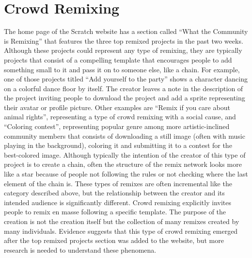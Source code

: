 \section{Crowd Remixing}
The home page of the Scratch website has a section called ``What the Community is Remixing''  that features the three top remixed projects in the past two weeks.
Although these projects could represent any type of remixing, they are typically projects that consist of a compelling template that encourages people to add something small to it and pass it on to someone else, like a chain.
For example, one of those projects titled ``Add yourself to the party'' shows a character dancing on a colorful dance floor by itself.
The creator leaves a note in the description of the project inviting people to download the project and add a sprite representing their avatar or profile picture.
Other examples are ``Remix if you care about animal rights'', representing a type of crowd remixing with a social cause, and ``Coloring contest'', representing popular genre among more artistic-inclined community members that consists of downloading a still image (often with music playing in the background), coloring it and submitting it to a contest for the best-colored image.
Although typically the intention of the creator of this type of project is to create a chain, often the structure of the remix network looks more like a star because of people not following the rules or not checking where the last element of the chain is.
These types of remixes are often incremental like the category described above, but the relationship between the creator and its intended audience is significantly different. 
Crowd remixing explicitly invites people to remix en masse following a specific template. 
The purpose of the creation is not the creation itself but the collection of many remixes created by many individuals.
Evidence suggests that this type of crowd remixing emerged after the top remixed projects section was added to the website, but more research is needed to understand these phenomena.

